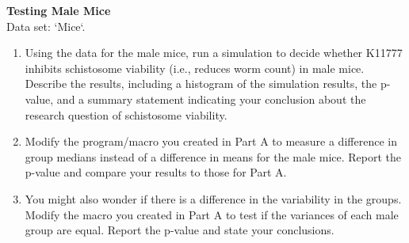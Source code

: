 \documentclass[
]{report}
\theoremstyle{definition}
\theoremstyle{definition}
\theoremstyle{definition}
\theoremstyle{definition}
\theoremstyle{remark}
\begin{document}
\begin{list}{E.}{ \setlength{\itemsep}{0.5em}}
  \item \textbf{Testing Male Mice} \\
  Data set: `Mice`. 
  \begin{enumerate}
    \setcounter{enumi}{0}  
    \item Using the data for the male mice, run a simulation to decide whether K11777 inhibits schistosome
viability (i.e., reduces worm count) in male mice. Describe the results, including a histogram
of the simulation results, the p-value, and a summary statement indicating your conclusion
about the research question of schistosome viability.
    \item Modify the program/macro you created in Part A to measure a difference in group medians
instead of a difference in means for the male mice. Report the p-value and compare your results
to those for Part A.
    \item You might also wonder if there is a difference in the variability in the groups. Modify the macro
you created in Part A to test if the variances of each male group are equal. Report the p-value and
state your conclusions.
  \end{enumerate}
  
  
  

\end{list}
\end{document}
